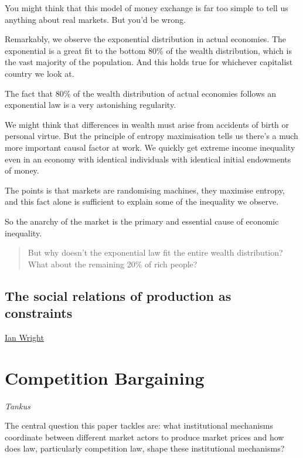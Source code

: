 \documentclass[
]{book}
\begin{document}
You might think that this model of money exchange is far too simple to tell us anything about real markets. But you'd be wrong.

Remarkably, we observe the exponential distribution in actual economies. The exponential is a great fit to the bottom 80\% of the wealth distribution, which is the vast majority of the population. And this holds true for whichever capitalist country we look at.

The fact that 80\% of the wealth distribution of actual economies follows an exponential law is a very astonishing regularity.

We might think that differences in wealth must arise from accidents of birth or personal virtue. But the principle of entropy maximisation tells us there's a much more important causal factor at work. We quickly get extreme income inequality even in an economy with identical individuals with identical initial endowments of money.

The points is that markets are randomising machines, they maximise entropy, and this fact alone is sufficient to explain some of the inequality we observe.

So the anarchy of the market is the primary and essential cause of economic inequality.

\begin{quote}
But why doesn't the exponential law fit the entire wealth distribution?
What about the remaining 20\% of rich people?
\end{quote}

\hypertarget{the-social-relations-of-production-as-constraints}{%
\subsection{The social relations of production as constraints}\label{the-social-relations-of-production-as-constraints}}

\href{https://ianwrightsite.wordpress.com/2017/11/16/the-social-architecture-of-capitalism/}{Ian Wright}

\hypertarget{competition-bargaining}{%
\section{Competition Bargaining}\label{competition-bargaining}}

\emph{Tankus}

The central question this paper tackles are: what institutional mechanisms coordinate between different market actors to produce market prices and how does law, particularly competition law, shape these institutional mechanisms?
\end{document}
